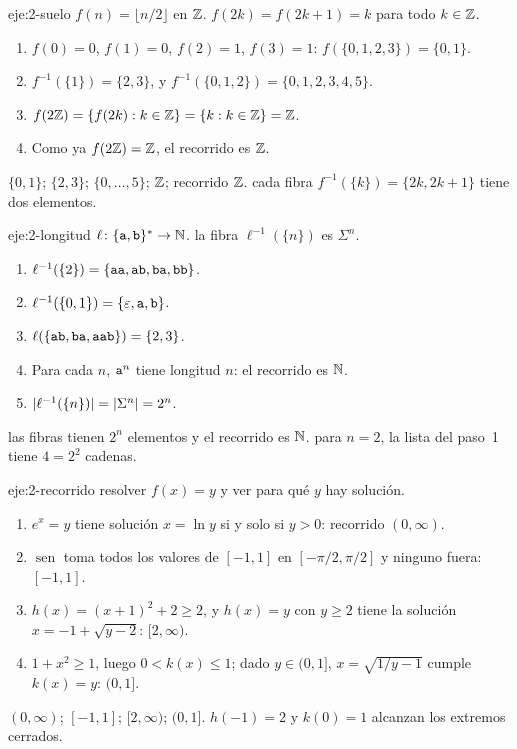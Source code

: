 \begin{solucion}{eje:2-suelo}
\datos $f(n)=\lfloor n/2\rfloor$ en $\mathbb{Z}$.
\planteamiento $f(2k)=f(2k+1)=k$ para todo $k\in\mathbb{Z}$.
\pasos
\begin{enumerate}[label=\arabic*.]
  \item $f(0)=0$, $f(1)=0$, $f(2)=1$, $f(3)=1$: $f(\{0,1,2,3\})=\{0,1\}$.
  \item $f^{-1}(\{1\})=\{2,3\}$, y $f^{-1}(\{0,1,2\})=\{0,1,2,3,4,5\}$.
  \item $f(2\mathbb{Z})=\{f(2k):k\in\mathbb{Z}\}=\{k:k\in\mathbb{Z}\}=\mathbb{Z}$.
  \item Como ya $f(2\mathbb{Z})=\mathbb{Z}$, el recorrido es $\mathbb{Z}$.
\end{enumerate}
\resultado $\{0,1\}$; $\{2,3\}$; $\{0,\dots,5\}$; $\mathbb{Z}$; recorrido $\mathbb{Z}$.
\comprobacion cada fibra $f^{-1}(\{k\})=\{2k,2k+1\}$ tiene dos elementos.
\end{solucion}

\begin{solucion}{eje:2-longitud}
\datos $\ell\colon\{\texttt{a},\texttt{b}\}^{*}\to\mathbb{N}$.
\planteamiento la fibra $\ell^{-1}(\{n\})$ es $\Sigma^{n}$.
\pasos
\begin{enumerate}[label=\arabic*.]
  \item $\ell^{-1}(\{2\})=\{\texttt{aa},\texttt{ab},\texttt{ba},\texttt{bb}\}$.
  \item $\ell^{-1}(\{0,1\})=\{\varepsilon,\texttt{a},\texttt{b}\}$.
  \item $\ell(\{\texttt{ab},\texttt{ba},\texttt{aab}\})=\{2,3\}$.
  \item Para cada $n$, $\texttt{a}^{n}$ tiene longitud $n$: el recorrido es $\mathbb{N}$.
  \item $\lvert\ell^{-1}(\{n\})\rvert=\lvert\Sigma^{n}\rvert=2^{n}$.
\end{enumerate}
\resultado las fibras tienen $2^{n}$ elementos y el recorrido es $\mathbb{N}$.
\comprobacion para $n=2$, la lista del paso~1 tiene $4=2^{2}$ cadenas.
\end{solucion}

\begin{solucion}{eje:2-recorrido}
\planteamiento resolver $f(x)=y$ y ver para qué $y$ hay solución.
\pasos
\begin{enumerate}[label=(\alph*)]
  \item $e^{x}=y$ tiene solución $x=\ln y$ si y solo si $y>0$: recorrido $(0,\infty)$.
  \item $\operatorname{sen}$ toma todos los valores de $[-1,1]$ en $[-\pi/2,\pi/2]$ y ninguno fuera: $[-1,1]$.
  \item $h(x)=(x+1)^{2}+2\ge2$, y $h(x)=y$ con $y\ge2$ tiene la solución $x=-1+\sqrt{y-2}$: $[2,\infty)$.
  \item $1+x^{2}\ge1$, luego $0<k(x)\le1$; dado $y\in(0,1]$, $x=\sqrt{1/y-1}$ cumple $k(x)=y$: $(0,1]$.
\end{enumerate}
\resultado $(0,\infty)$; $[-1,1]$; $[2,\infty)$; $(0,1]$.
\comprobacion $h(-1)=2$ y $k(0)=1$ alcanzan los extremos cerrados.
\end{solucion}

